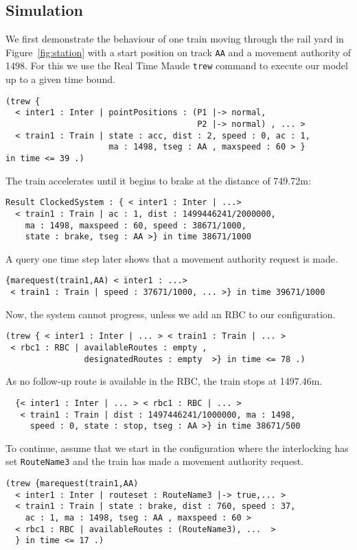 \subsection{Simulation}
We first demonstrate the behaviour of one train moving through the
rail yard in Figure~\ref{fig:station} with a start position on track
\texttt{AA} and a movement authority of 1498. For this we use the
Real Time Maude \texttt{trew} command to execute our model up to a
given time bound.
\begin{lstlisting}
(trew { 
  < inter1 : Inter | pointPositions : (P1 |-> normal,
                                       P2 |-> normal) , ... >
  < train1 : Train | state : acc, dist : 2, speed : 0, ac : 1, 
                     ma : 1498, tseg : AA , maxspeed : 60 > }
in time <= 39 .)
\end{lstlisting}
The train accelerates until it begins to brake at
the distance of 749.72m:
\begin{lstlisting}
Result ClockedSystem : { < inter1 : Inter | ...>
  < train1 : Train | ac : 1, dist : 1499446241/2000000,
    ma : 1498, maxspeed : 60, speed : 38671/1000, 
    state : brake, tseg : AA >} in time 38671/1000
\end{lstlisting}
A query one time step later shows that a movement authority request is made.
\begin{lstlisting}
{marequest(train1,AA) < inter1 : ...> 
 < train1 : Train | speed : 37671/1000, ... >} in time 39671/1000
\end{lstlisting}
Now, the system cannot progress, unless we add an RBC to
our configuration. 
\begin{lstlisting}
(trew { < inter1 : Inter | ... > < train1 : Train | ... >
 < rbc1 : RBC | availableRoutes : empty ,
                designatedRoutes : empty  >} in time <= 78 .)
\end{lstlisting}
As no follow-up route is available in the RBC, the train stops at 1497.46m.
\begin{lstlisting}
  {< inter1 : Inter | ... > < rbc1 : RBC | ... >
   < train1 : Train | dist : 1497446241/1000000, ma : 1498,
     speed : 0, state : stop, tseg : AA >} in time 38671/500
\end{lstlisting}
To continue, assume that we start in the configuration where the
interlocking has set \texttt{RouteName3} and the train has made a
movement authority request.
\begin{lstlisting}
(trew {marequest(train1,AA)
  < inter1 : Inter | routeset : RouteName3 |-> true,... >
  < train1 : Train | state : brake, dist : 760, speed : 37,
    ac : 1, ma : 1498, tseg : AA , maxspeed : 60 >
  < rbc1 : RBC | availableRoutes : (RouteName3), ...  >
  } in time <= 17 .)
\end{lstlisting}

